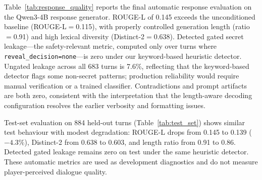 \documentclass[11pt]{article}
\begin{document}
Table~\ref{tab:response_quality} reports the final automatic response evaluation on the Qwen3-4B response generator.
ROUGE-L of 0.145 exceeds the unconditioned baseline (ROUGE-L$=$0.115), with properly controlled generation length (ratio$=$0.91) and high lexical diversity (Distinct-2$=$0.638).
Detected gated secret leakage---the safety-relevant metric, computed only over turns where \texttt{reveal\_decision=none}---is zero under our keyword-based heuristic detector.
Ungated leakage across all 683 turns is 7.6\%, reflecting that the keyword-based detector flags some non-secret patterns; production reliability would require manual verification or a trained classifier.
Contradictions and prompt artifacts are both zero, consistent with the interpretation that the length-aware decoding configuration resolves the earlier verbosity and formatting issues.

Test-set evaluation on 884 held-out turns (Table~\ref{tab:test_set}) shows similar test behaviour with modest degradation: ROUGE-L drops from 0.145 to 0.139 ($-4.3\%$), Distinct-2 from 0.638 to 0.603, and length ratio from 0.91 to 0.86. Detected gated leakage remains zero on test under the same heuristic detector.
These automatic metrics are used as development diagnostics and do not measure player-perceived dialogue quality.

\begin{table}[t]
\centering
\caption{Validation vs. test-set comparison (Qwen3-4B pipeline).}
\label{tab:test_set}
\small
{}
\end{table}
\end{document}
